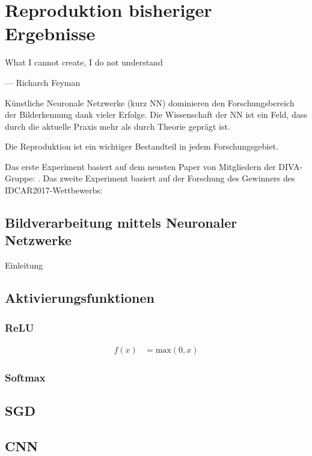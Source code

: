 \chapter{Reproduktion bisheriger Ergebnisse}
\label{chap:reproduktion}
\epigraph{What I cannot create, I do not understand}{--- Richarch Feyman}

Künstliche Neuronale Netzwerke (kurz NN) dominieren den Forschungsbereich der 
Bilderkennung dank vieler Erfolge. 
Die Wissenschaft der NN ist ein Feld, dass durch die aktuelle Praxis mehr als durch Theorie geprägt ist. 

Die Reproduktion ist ein wichtiger Bestandteil in jedem Forschungsgebiet. 


Das erste Experiment basiert auf dem neusten Paper von Mitgliedern der DIVA-Gruppe: \citeauthor*{ChenConvolutionalNeuralNetworks2017}. 
Das zweite Experiment basiert auf der Forschung des Gewinners des IDCAR2017-Wettbewerbs: \citeauthor*{XuPageSegmentationHistorical2017} 

\section{Bildverarbeitung mittels Neuronaler Netzwerke}
Einleitung \cite{LeCunDeeplearning2015}
\section{Aktivierungsfunktionen}
\subsection{ReLU}
\begin{align}
    f\left(x\right) &= \text{max}(0,x)
\end{align}
\subsection{Softmax}

\section{SGD}
\section{CNN}
\cite{RawatDeepConvolutionalNeural2017}

\section{\cite{ChenConvolutionalNeuralNetworks2017}}

